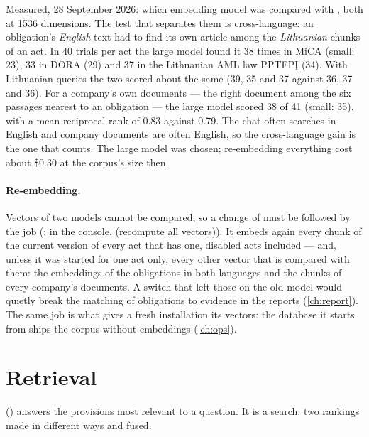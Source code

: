 \begin{lessonbox}{Measured, 28 September 2026: which embedding model}
 was compared with , both at 1536
dimensions. The test that separates them is cross-language: an obligation's \emph{English}
text had to find its own article among the \emph{Lithuanian} chunks of an act. In 40 trials
per act the large model found it 38 times in MiCA (small: 23), 33 in DORA (29) and 37 in the
Lithuanian AML law PPTFPĮ (34). With Lithuanian queries the two scored about the same (39, 35
and 37 against 36, 37 and 36). For a company's own documents --- the right document among the
six passages nearest to an obligation --- the large model scored 38 of 41 (small: 35), with a
mean reciprocal rank of 0.83 against 0.79. The chat often searches in English and company
documents are often English, so the cross-language gain is the one that counts. The large
model was chosen; re-embedding everything cost about \$0.30 at the corpus's size then.
\end{lessonbox}

\paragraph{Re-embedding.} Vectors of two models cannot be compared, so a change of
 must be followed by the job 
(; in the console, 
(recompute all vectors)). It
embeds again every chunk of the current version of every act that has one, disabled acts
included --- and, unless it was started for one act
only, every other vector that is compared with them: the embeddings of the obligations in both
languages and the chunks of every company's documents. A switch that left those on the old
model would quietly break the matching of obligations to evidence in the reports
(\cref{ch:report}). The same job is what gives a fresh installation its vectors: the database
it starts from ships the corpus without embeddings (\cref{ch:ops}).


\section{Retrieval}\label{sec:corpus:search}

 () answers the provisions most relevant to a
question. It is a  search: two rankings made in different ways and fused.

